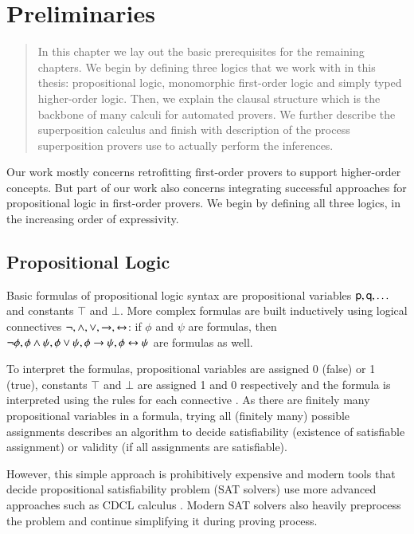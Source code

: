 \chapter{Preliminaries}
\label{ch:pre}

\begin{abstract}
    In this chapter we lay out the basic prerequisites for the remaining
    chapters. We begin by defining three logics that we work with in this
    thesis: propositional logic, monomorphic first-order logic and simply typed
    higher-order logic. Then, we explain the clausal structure which is the
    backbone of many calculi for automated provers. We further describe the
    superposition calculus and finish with description of the process superposition
    provers use to actually perform the inferences.
\end{abstract}
      
\newpage

Our work mostly concerns retrofitting first-order provers to support
higher-order concepts. But part of our work also concerns integrating
successful approaches for propositional logic in first-order
provers. We begin by defining all three logics, in the increasing
order of expressivity.

\section{Propositional Logic}

Basic formulas of propositional logic syntax are propositional variables
$\mathsf{p}, \mathsf{q}, \ldots$ and constants $\top$ and $\bot$. More complex
formulas are built inductively using logical connectives $\neg, \land, \lor,
\rightarrow, \leftrightarrow$: if $\phi$ and $\psi$ are formulas, then $\neg \phi, \phi \land
\psi, \phi \lor \psi, \phi \rightarrow \psi, \phi \leftrightarrow \psi$ are formulas as well.

To interpret the formulas, propositional variables are assigned 0 (false) or 1
(true), constants $\top$ and $\bot$ are assigned 1 and 0 respectively and the
formula is interpreted using the rules for each connective
\cite[Sect.~1.4]{hr-00-logic-in-cs}. As there are finitely many propositional
variables in a formula, trying all (finitely many) possible assignments
describes an algorithm to decide satisfiability (existence of satisfiable
assignment) or validity (if all assignments are satisfiable).

However, this simple approach is prohibitively expensive and modern tools that
decide propositional satisfiability problem (SAT solvers) use more advanced
approaches such as CDCL calculus \cite{mss-96-cdcl}. Modern SAT solvers also
heavily preprocess the problem and continue simplifying it during proving
process.

